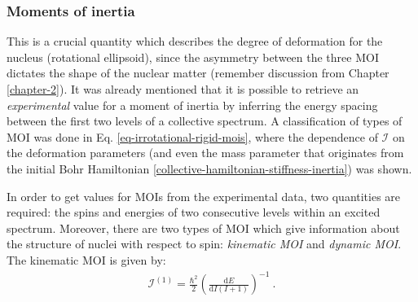 \subsubsection*{Moments of inertia}

This is a crucial quantity which describes the degree of deformation for the nucleus (rotational ellipsoid), since the asymmetry between the three MOI dictates the shape of the nuclear matter (remember discussion from Chapter \ref{chapter-2}). It was already mentioned that it is possible to retrieve an \emph{experimental} value for a moment of inertia by inferring the energy spacing between the first two levels of a collective spectrum. A classification of types of MOI was done in Eq. \ref{eq-irrotational-rigid-mois}, where the dependence of $\mathcal{I}$ on the deformation parameters (and even the mass parameter that originates from the initial Bohr Hamiltonian \ref{collective-hamiltonian-stiffness-inertia}) was shown.

In order to get values for MOIs from the experimental data, two quantities are required: the spins and energies of two consecutive levels within an excited spectrum. Moreover, there are two types of MOI which give information about the structure of nuclei with respect to spin: \emph{kinematic MOI} and \emph{dynamic MOI}. The kinematic MOI is given by:
\begin{align}
    \mathcal{I}^{(1)}=\frac{\hbar^2}{2}\left(\frac{\text{d}E}{\text{d}I(I+1)}\right)^{-1}\ .
\end{align}